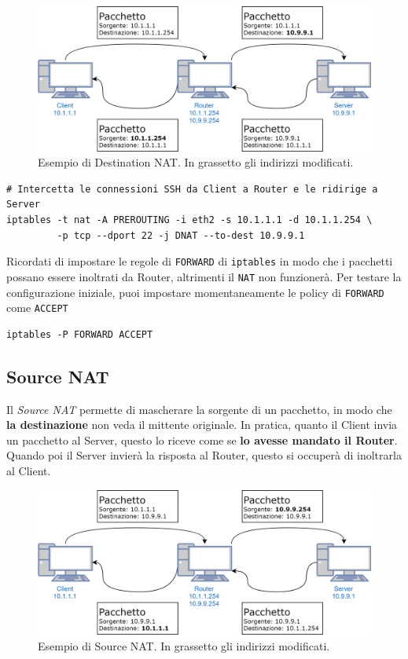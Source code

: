 \documentclass[a4paper]{report}
\newenvironment{ricordati}{\begin{tcolorbox}[fonttitle=\sffamily\bfseries\large,title=Ricordati,colframe=orange!75!white]}{\end{tcolorbox}}
\newenvironment{code}{\begin{tcolorbox}[size=small]}{\end{tcolorbox}}
\begin{document}
\begin{figure}[htb!]
	\includegraphics[width=\linewidth]{DNAT}
	\caption{Esempio di Destination NAT. In grassetto gli indirizzi modificati.}
\end{figure}

\begin{code}
\begin{lstlisting}
# Intercetta le connessioni SSH da Client a Router e le ridirige a Server
iptables -t nat -A PREROUTING -i eth2 -s 10.1.1.1 -d 10.1.1.254 \
         -p tcp --dport 22 -j DNAT --to-dest 10.9.9.1
\end{lstlisting}
\end{code}

\begin{ricordati}
	Ricordati di impostare le regole di \texttt{FORWARD} di \texttt{iptables} in modo che i pacchetti possano essere inoltrati da Router, altrimenti il \texttt{NAT} non funzionerà. Per testare la configurazione iniziale, puoi impostare momentaneamente le policy di \texttt{FORWARD} come \texttt{ACCEPT}
	\begin{lstlisting}
iptables -P FORWARD ACCEPT
	\end{lstlisting}
\end{ricordati}


\subsection{Source NAT}

Il \textit{Source NAT} permette di mascherare la sorgente di un pacchetto, in modo che \textbf{la destinazione} non veda il mittente originale. In pratica, quanto il Client invia un pacchetto al Server, questo lo riceve come se \textbf{lo avesse mandato il Router}. Quando poi il Server invierà la risposta al Router, questo si occuperà di inoltrarla al Client.

\begin{figure}[htb!]
	\includegraphics[width=\linewidth]{SNAT}
	\caption{Esempio di Source NAT. In grassetto gli indirizzi modificati.}
\end{figure}
\end{document}
